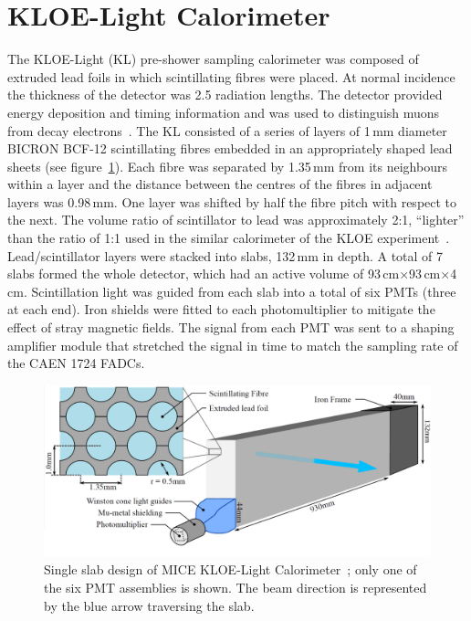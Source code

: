 \graphicspath{ {04-KL/Figures/} }

\section{KLOE-Light Calorimeter}
\label{Sect:KL}

The KLOE-Light (KL) pre-shower sampling calorimeter was composed of
extruded lead foils in which scintillating fibres were placed.
At normal incidence the thickness of the detector was 2.5 radiation
lengths.
The detector provided energy deposition and timing information and was
used to distinguish muons from decay
electrons~\cite{2016JInst..11P3001A}.
The KL consisted of a series of layers of 1\,mm diameter BICRON BCF-12
scintillating fibres embedded in an appropriately shaped lead sheets
(see figure~\ref{fig:KL2}).
Each fibre was separated by 1.35\,mm from its neighbours within a
layer and the distance between the centres of the fibres in adjacent
layers was 0.98\,mm.
One layer was shifted by half the fibre pitch with respect to the next.
The volume ratio of scintillator to lead was approximately 2:1,
``lighter'' than the ratio of 1:1 used in the similar calorimeter of the KLOE
experiment~\cite{Ambrosino:2009zza}. 
Lead/scintillator layers were stacked into slabs, 132\,mm in depth.
A total of 7 slabs formed the whole detector, which had an active
volume of 93\,cm$\times$93\,cm$\times$4\,cm.
Scintillation light was guided from each slab into a total of six PMTs
(three at each end).
Iron shields were fitted to each photomultiplier to mitigate the effect of stray magnetic fields.
The signal from each PMT was sent to a shaping amplifier module
that stretched the signal in time to match the sampling rate
of the CAEN 1724 FADCs. \\
\begin{figure}
  \begin{center}
    \includegraphics[width=0.85\columnwidth]{./04-KL/Figures/KL2_with_beam.png}
    \caption{Single slab design of MICE KLOE-Light Calorimeter~\cite{Overton:2014tka}; only one of the six PMT assemblies is shown.
    The beam direction is represented by the blue arrow traversing the slab.
    }
    \label{fig:KL2}
  \end{center}
\end{figure}


